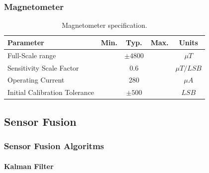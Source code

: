 \subsubsection{Magnetometer}

\begin{table}[H]
    \begin{center}
        \begin{tabular}[t]{lcccc}
            \hline
            Parameter                     & Min. & Typ.       & Max. & Units        \\
            \hline
            Full-Scale range              &      & $\pm 4800$ &      & $\mu T$      \\
            Sensitivity Scale Factor      &      & 0.6        &      & $\mu T/ LSB$ \\
            Operating Current             &      & 280        &      & $\mu A$      \\
            Initial Calibration Tolerance &      & $\pm 500$  &      & $LSB$        \\
            \hline
        \end{tabular}
        \caption{Magnetometer specification. }
        \label{tab:magnetometer_multiplication}
    \end{center}
\end{table}

\subsection{Sensor Fusion}
\subsubsection{Sensor Fusion Algoritms}
\paragraph{Kalman Filter}

